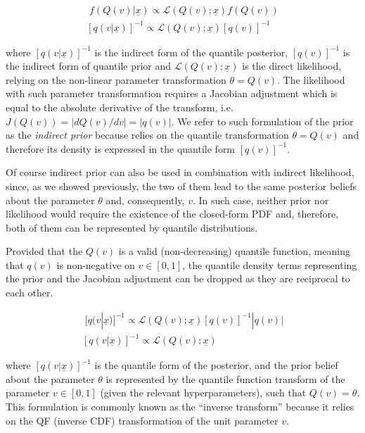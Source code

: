 \documentclass[
  12pt,
]{article}
\begin{document}
\[
\begin{gathered}\;
f(Q(v)|\underline{x}) \propto \mathcal{L}(Q(v);\underline{x})f(Q(v)) \\
[q(v|\underline{x})]^{-1} \propto \mathcal{L}(Q(v);\underline{x})[q(v)]^{-1}
\end{gathered}
\label{eq:bayesdqfdqfeq}
\]

where \([q(v|\underline{x})]^{-1}\) is the indirect form of the quantile posterior, \([q(v)]^{-1}\) is the indirect form of quantile prior and \(\mathcal{L}(Q(v);\underline{x})\) is the direct likelihood, relying on the non-linear parameter transformation \(\theta=Q(v)\). The likelihood with such parameter transformation requires a Jacobian adjustment which is equal to the absolute derivative of the transform, i.e.~\(J(Q(v))=|dQ(v)/dv|=|q(v)|\). We refer to such formulation of the prior as the \emph{indirect prior} because relies on the quantile transformation \(\theta=Q(v)\) and therefore its density is expressed in the quantile form \([q(v)]^{-1}\).

Of course indirect prior can also be used in combination with indirect likelihood, since, as we showed previously, the two of them lead to the same posterior beliefs about the parameter \(\theta\) and, consequently, \(v\). In such case, neither prior nor likelihood would require the existence of the closed-form PDF and, therefore, both of them can be represented by quantile distributions.

Provided that the \(Q(v)\) is a valid (non-decreasing) quantile function, meaning that \(q(v)\) is non-negative on \(v \in [0,1]\), the quantile density terms representing the prior and the Jacobian adjustment can be dropped as they are reciprocal to each other.

\[ 
\begin{gathered}\;
[q(v|\underline{x})]^{-1} \propto \mathcal{L}(Q(v);\underline{x})[q(v)]^{-1}|q(v)| \\
[q(v|\underline{x})]^{-1} \propto \mathcal{L}(Q(v);\underline{x})
\end{gathered}
\label{eq:bayesidqfeq}
\]

where \([q(v|\underline{x})]^{-1}\) is the quantile form of the posterior, and the prior belief about the parameter \(\theta\) is represented by the quantile function transform of the parameter \(v \in [0,1]\) (given the relevant hyperparameters), such that \(Q(v)=\theta\). This formulation is commonly known as the ``inverse transform'' because it relies on the QF (inverse CDF) transformation of the unit parameter \(v\).
\end{document}
